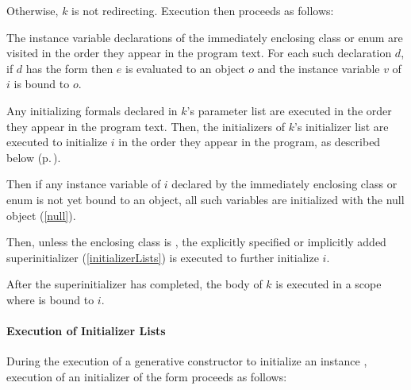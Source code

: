\documentclass[makeidx]{article}
\begin{document}
\LMHash{}%
Otherwise, $k$ is not redirecting.
Execution then proceeds as follows:

\LMHash{}%
The instance variable declarations of the immediately enclosing class or enum
are visited in the order they appear in the program text.
For each such declaration $d$, if $d$ has the form
then $e$ is evaluated to an object $o$
and the instance variable $v$ of $i$ is bound to $o$.

\LMHash{}%
Any initializing formals declared in $k$'s parameter list
are executed in the order they appear in the program text.
Then, the initializers of $k$'s initializer list are executed to initialize $i$
in the order they appear in the program, as described below
(p.\,\pageref{executionOfInitializerLists}).


\LMHash{}%
Then if any instance variable of $i$ declared
by the immediately enclosing class or enum
is not yet bound to an object,
all such variables are initialized with the null object (\ref{null}).

\LMHash{}%
Then, unless the enclosing class is , the explicitly specified or
implicitly added superinitializer (\ref{initializerLists}) is executed to
further initialize $i$.

\LMHash{}%
After the superinitializer has completed, the body of $k$ is executed
in a scope where \THIS{} is bound to $i$.



\paragraph{Execution of Initializer Lists}

\LMHash{}%
During the execution of a generative constructor to initialize an instance
,
execution of an initializer of the form 
proceeds as follows:
\end{document}
